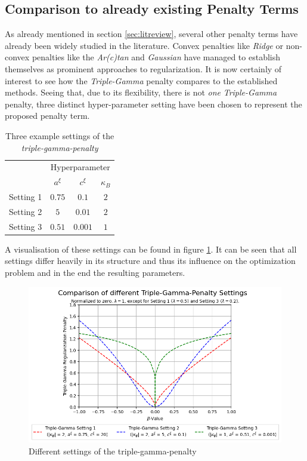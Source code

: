 \documentclass[12pt,a4paper]{article}
\begin{document}
\newpage

\subsection{Comparison to already existing Penalty Terms}\label{subsec:comparepenalties}

As already mentioned in section \ref{sec:litreview}, several other penalty terms have already been widely studied in the literature. Convex penalties like \textit{Ridge} \parencite{HoerlKennard1970a} or non-convex penalties like the \textit{Ar(c)tan} \parencite{WangZhu2016} and \textit{Gaussian} \parencite{JohnVettamWu2022} have managed to establish themselves as prominent approaches to regularization. It is now certainly of interest to see how the \textit{Triple-Gamma} penalty compares to the established methods. Seeing that, due to its flexibility, there is not \textit{one} \textit{Triple-Gamma} penalty, three distinct hyper-parameter setting have been chosen to represent the proposed penalty term. 

\begin{table}[h!]
\centering
\begin{tabular}{l|ccc}\toprule
		& \multicolumn{3}{c}{Hyperparameter} \\\cmidrule(r{4pt}){2-4}
     	& $a^\xi$  & $c^\xi$ & $\kappa_B$\\\midrule
Setting 1&	$0.75$	&	$0.1$ &	$2$\\
Setting 2&	$5$  &   $0.01$ & $2$\\
Setting 3&  $0.51$  & $0.001$&$1$\\ \bottomrule
\end{tabular}
\caption{Three example settings of the \textit{triple-gamma-penalty}}
\label{tab:TGSettings}
\end{table}

A visualisation of these settings can be found in figure \ref{fig:DifferentTGPSettings}. It can be seen that all settings differ heavily in its structure and thus its influence on the optimization problem and in the end the resulting parameters. 

\begin{figure}[H]
\centering
\includegraphics[scale=0.75]{../02_simulation/021_simulation_figures/TGPenalty_DifferentSettings.png}
\caption{Different settings of the triple-gamma-penalty}
\label{fig:DifferentTGPSettings}
\end{figure}
\end{document}
